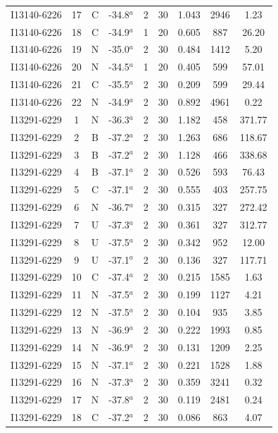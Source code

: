 \begin{table}
\begin{tabular}{ccccccccc}
I13140-6226 & 17 & C & -34.8$^{a}$ & 2 & 30 & 1.043 & 2946 & 1.23 \\
I13140-6226 & 18 & C & -34.9$^{a}$ & 1 & 20 & 0.605 & 887 & 26.20 \\
I13140-6226 & 19 & N & -35.0$^{a}$ & 2 & 30 & 0.484 & 1412 & 5.20 \\
I13140-6226 & 20 & N & -34.5$^{a}$ & 1 & 20 & 0.405 & 599 & 57.01 \\
I13140-6226 & 21 & C & -35.5$^{a}$ & 2 & 30 & 0.209 & 599 & 29.44 \\
I13140-6226 & 22 & N & -34.9$^{a}$ & 2 & 30 & 0.892 & 4961 & 0.22 \\
I13291-6229 & 1 & N & -36.3$^{a}$ & 2 & 30 & 1.182 & 458 & 371.77 \\
I13291-6229 & 2 & B & -37.2$^{a}$ & 2 & 30 & 1.263 & 686 & 118.67 \\
I13291-6229 & 3 & B & -37.2$^{a}$ & 2 & 30 & 1.128 & 466 & 338.68 \\
I13291-6229 & 4 & B & -37.1$^{a}$ & 2 & 30 & 0.526 & 593 & 76.43 \\
I13291-6229 & 5 & C & -37.1$^{a}$ & 2 & 30 & 0.555 & 403 & 257.75 \\
I13291-6229 & 6 & N & -36.7$^{a}$ & 2 & 30 & 0.315 & 327 & 272.42 \\
I13291-6229 & 7 & U & -37.3$^{a}$ & 2 & 30 & 0.361 & 327 & 312.77 \\
I13291-6229 & 8 & U & -37.5$^{a}$ & 2 & 30 & 0.342 & 952 & 12.00 \\
I13291-6229 & 9 & U & -37.1$^{a}$ & 2 & 30 & 0.136 & 327 & 117.71 \\
I13291-6229 & 10 & C & -37.4$^{a}$ & 2 & 30 & 0.215 & 1585 & 1.63 \\
I13291-6229 & 11 & N & -37.5$^{a}$ & 2 & 30 & 0.199 & 1127 & 4.21 \\
I13291-6229 & 12 & N & -37.5$^{a}$ & 2 & 30 & 0.104 & 935 & 3.85 \\
I13291-6229 & 13 & N & -36.9$^{a}$ & 2 & 30 & 0.222 & 1993 & 0.85 \\
I13291-6229 & 14 & N & -36.9$^{a}$ & 2 & 30 & 0.131 & 1209 & 2.25 \\
I13291-6229 & 15 & N & -37.1$^{a}$ & 2 & 30 & 0.221 & 1528 & 1.88 \\
I13291-6229 & 16 & N & -37.3$^{a}$ & 2 & 30 & 0.359 & 3241 & 0.32 \\
I13291-6229 & 17 & N & -37.8$^{a}$ & 2 & 30 & 0.119 & 2481 & 0.24 \\
I13291-6229 & 18 & C & -37.2$^{a}$ & 2 & 30 & 0.086 & 863 & 4.07 \\

\end{tabular}
\end{table}
